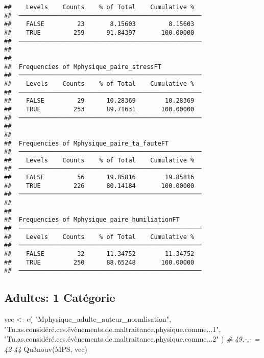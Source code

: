 \documentclass[
]{article}
\newenvironment{Shaded}{\begin{snugshade}}{\end{snugshade}}
\newcommand{\CommentTok}[1]{\textcolor[rgb]{0.56,0.35,0.01}{\textit{#1}}}
\newcommand{\FunctionTok}[1]{\textcolor[rgb]{0.00,0.00,0.00}{#1}}
\newcommand{\NormalTok}[1]{#1}
\newcommand{\OtherTok}[1]{\textcolor[rgb]{0.56,0.35,0.01}{#1}}
\newcommand{\StringTok}[1]{\textcolor[rgb]{0.31,0.60,0.02}{#1}}
\begin{document}
\begin{verbatim}
##    Levels    Counts    % of Total    Cumulative %   
##  ────────────────────────────────────────────────── 
##    FALSE         23       8.15603         8.15603   
##    TRUE         259      91.84397       100.00000   
##  ────────────────────────────────────────────────── 
## 
## 
##  Frequencies of Mphysique_paire_stressFT            
##  ────────────────────────────────────────────────── 
##    Levels    Counts    % of Total    Cumulative %   
##  ────────────────────────────────────────────────── 
##    FALSE         29      10.28369        10.28369   
##    TRUE         253      89.71631       100.00000   
##  ────────────────────────────────────────────────── 
## 
## 
##  Frequencies of Mphysique_paire_ta_fauteFT          
##  ────────────────────────────────────────────────── 
##    Levels    Counts    % of Total    Cumulative %   
##  ────────────────────────────────────────────────── 
##    FALSE         56      19.85816        19.85816   
##    TRUE         226      80.14184       100.00000   
##  ────────────────────────────────────────────────── 
## 
## 
##  Frequencies of Mphysique_paire_humiliationFT       
##  ────────────────────────────────────────────────── 
##    Levels    Counts    % of Total    Cumulative %   
##  ────────────────────────────────────────────────── 
##    FALSE         32      11.34752        11.34752   
##    TRUE         250      88.65248       100.00000   
##  ──────────────────────────────────────────────────
\end{verbatim}

\hypertarget{adultes-1-catuxe9gorie}{%
\subsection{Adultes: 1 Catégorie}\label{adultes-1-catuxe9gorie}}

\begin{Shaded}
\begin{Highlighting}[]
\NormalTok{vec }\OtherTok{\textless{}{-}} \FunctionTok{c}\NormalTok{(}
  \StringTok{"Mphysique\_adulte\_auteur\_normlisation"}\NormalTok{,}
   \StringTok{"Tu.as.considéré.ces.évènements.de.maltraitance.physique.comme...1"}\NormalTok{,}
   \StringTok{"Tu.as.considéré.ces.évènements.de.maltraitance.physique.comme...2"}
\NormalTok{  )  }\CommentTok{\# 49,{-},{-} = 42{-}44}
\FunctionTok{Qu3nouv}\NormalTok{(MPS, vec)}
\end{Highlighting}
\end{Shaded}
\end{document}
